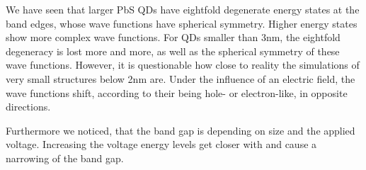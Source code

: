 We have seen that larger PbS QDs have eightfold degenerate energy states at the band edges, whose wave functions have spherical symmetry. Higher energy states show more complex wave functions. For QDs smaller than 3nm, the eightfold degeneracy is lost more and more, as well as the spherical symmetry of these wave functions. However, it is questionable how close to reality the simulations of very small structures below 2nm are.
Under the influence of an electric field, the wave functions shift, according to their being hole- or electron-like, in opposite directions.

Furthermore we noticed, that the band gap is depending on size and the applied voltage. Increasing the voltage energy levels get closer with and
cause a narrowing of the band gap.